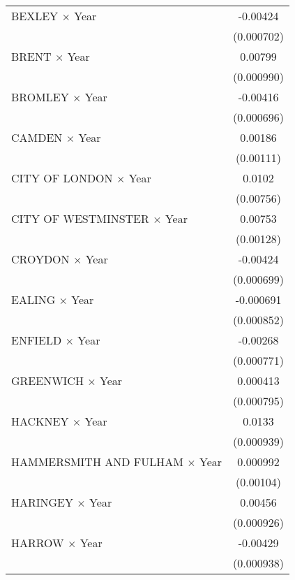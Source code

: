 {\begin{longtable}{l*{1}{c}}
BEXLEY $\times$ Year&    -0.00424\sym{***}\\
                    &  (0.000702)         \\
\addlinespace
BRENT $\times$ Year &     0.00799\sym{***}\\
                    &  (0.000990)         \\
\addlinespace
BROMLEY $\times$ Year&    -0.00416\sym{***}\\
                    &  (0.000696)         \\
\addlinespace
CAMDEN $\times$ Year&     0.00186         \\
                    &   (0.00111)         \\
\addlinespace
CITY OF LONDON $\times$ Year&      0.0102         \\
                    &   (0.00756)         \\
\addlinespace
CITY OF WESTMINSTER $\times$ Year&     0.00753\sym{***}\\
                    &   (0.00128)         \\
\addlinespace
CROYDON $\times$ Year&    -0.00424\sym{***}\\
                    &  (0.000699)         \\
\addlinespace
EALING $\times$ Year&   -0.000691         \\
                    &  (0.000852)         \\
\addlinespace
ENFIELD $\times$ Year&    -0.00268\sym{***}\\
                    &  (0.000771)         \\
\addlinespace
GREENWICH $\times$ Year&    0.000413         \\
                    &  (0.000795)         \\
\addlinespace
HACKNEY $\times$ Year&      0.0133\sym{***}\\
                    &  (0.000939)         \\
\addlinespace
HAMMERSMITH AND FULHAM $\times$ Year&    0.000992         \\
                    &   (0.00104)         \\
\addlinespace
HARINGEY $\times$ Year&     0.00456\sym{***}\\
                    &  (0.000926)         \\
\addlinespace
HARROW $\times$ Year&    -0.00429\sym{***}\\
                    &  (0.000938)         \\

\end{longtable}}
